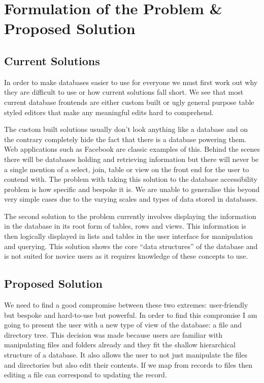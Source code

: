 \chapter{Formulation of the Problem \& Proposed Solution}

\section{Current Solutions}

In order to make databases easier to use for everyone we must first work out why they are difficult to use or how current solutions fall short. We see that most current database frontends are either custom built or ugly general purpose table styled editors that make any meaningful edits hard to comprehend.

The custom built solutions usually don't look anything like a database and on the contrary completely hide the fact that there is a database powering them. Web applications such as Facebook are classic examples of this. Behind the scenes there will be databases holding and retrieving information but there will never be a single mention of a select, join, table or view on the front end for the user to contend with. The problem with taking this solution to the database accessibility problem is how specific and bespoke it is. We are unable to generalise this beyond very simple cases due to the varying scales and types of data stored in databases.

The second solution to the problem currently involves displaying the information in the database in its root form of tables, rows and views. This information is then logically displayed in lists and tables in the user interface for manipulation and querying. This solution shows the core ``data structures'' of the database and is not suited for novice users as it requires knowledge of these concepts to use.

\section{Proposed Solution}

We need to find a good compromise between these two extremes: user-friendly but bespoke and hard-to-use but powerful. In order to find this compromise I am going to present the user with a new type of view of the database: a file and directory tree. This decision was made because users are familiar with manipulating files and folders already and they fit the shallow hierarchical structure of a database. It also allows the user to not just manipulate the files and directories but also edit their contents. If we map from records to files then editing a file can correspond to updating the record.
